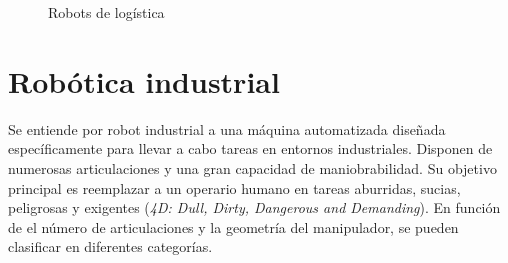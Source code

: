 \begin{figure} [ht!]
    \centering    
    \hspace{1cm}

    \caption{Robots de logística}
\end{figure}



\section{Robótica industrial}
\label{sec:rob_industrial}
\noindent Se entiende por robot industrial a una máquina automatizada diseñada específicamente para llevar a cabo tareas en entornos industriales. 
Disponen de numerosas articulaciones y una gran capacidad de maniobrabilidad. Su objetivo principal es reemplazar a un 
operario humano en tareas aburridas, sucias, peligrosas y exigentes (\textit{4D: Dull, Dirty, Dangerous and Demanding}).
En función de el número de articulaciones y la geometría del manipulador, se pueden clasificar en diferentes categorías.

